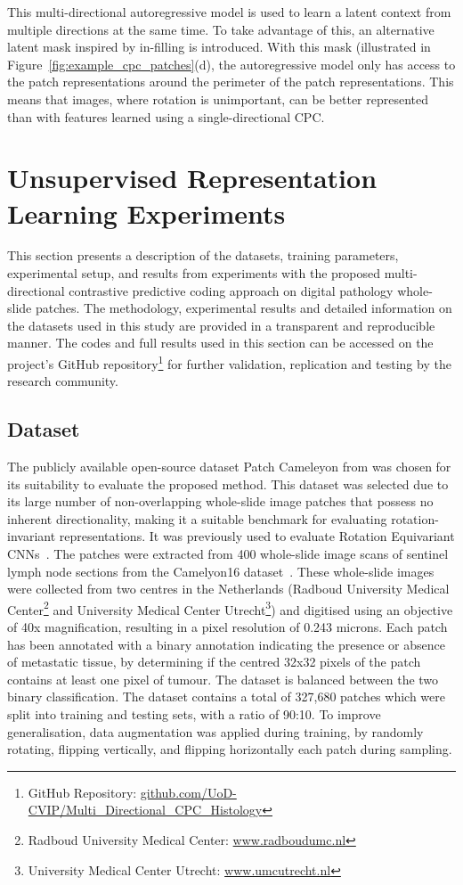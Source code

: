 This multi-directional autoregressive model is used to learn a latent context from multiple directions at the same time. To take advantage of this, an alternative latent mask inspired by in-filling is introduced. With this mask (illustrated in Figure~\ref{fig:example_cpc_patches}(d), the autoregressive model only has access to the patch representations around the perimeter of the patch representations. This means that images, where rotation is unimportant, can be better represented than with features learned using a single-directional CPC.



\section{Unsupervised Representation Learning Experiments}
\label{sec:unsupervised_experiments}
This section presents a description of the datasets, training parameters, experimental setup, and results from experiments with the proposed multi-directional contrastive predictive coding approach on digital pathology whole-slide patches. The methodology, experimental results and detailed information on the datasets used in this study are provided in a transparent and reproducible manner. The codes and full results used in this section can be accessed on the project's GitHub repository\footnote{GitHub Repository: \url{github.com/UoD-CVIP/Multi_Directional_CPC_Histology}} for further validation, replication and testing by the research community.

\subsection{Dataset}
\label{subsec:unsupervised_dataset}
The publicly available open-source dataset Patch Cameleyon from \cite{veeling2018rotation} was chosen for its suitability to evaluate the proposed method. This dataset was selected due to its large number of non-overlapping whole-slide image patches that possess no inherent directionality, making it a suitable benchmark for evaluating rotation-invariant representations. It was previously used to evaluate Rotation Equivariant CNNs~\citep{veeling2018rotation}. The patches were extracted from 400 whole-slide image scans of sentinel lymph node sections from the Camelyon16 dataset~\citep{litjens20181399}. These whole-slide images were collected from two centres in the Netherlands (Radboud University Medical Center\footnote{Radboud University Medical Center: \url{www.radboudumc.nl}} and University Medical Center Utrecht\footnote{University Medical Center Utrecht: \url{www.umcutrecht.nl}}) and digitised using an objective of 40x magnification, resulting in a pixel resolution of 0.243 microns. Each patch has been annotated with a binary annotation indicating the presence or absence of metastatic tissue, by determining if the centred 32x32 pixels of the patch contains at least one pixel of tumour. The dataset is balanced between the two binary classification. The dataset contains a total of 327,680 patches which were split into training and testing sets, with a ratio of 90:10. To improve generalisation, data augmentation was applied during training, by randomly rotating, flipping vertically, and flipping horizontally each patch during sampling.

